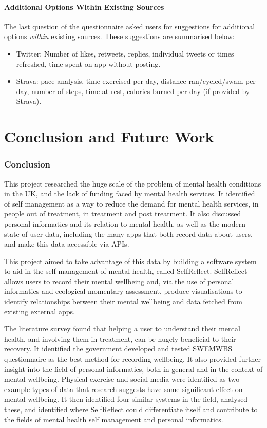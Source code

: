 \documentclass[11pt,openright,a4paper]{report}
\begin{document}
\subsubsection{Additional Options Within Existing Sources}
The last question of the questionnaire asked users for suggestions for additional options \emph{within} existing sources. These suggestions are summarised below:
\begin{itemize}
\item Twitter: Number of likes, retweets, replies, individual tweets or times refreshed, time spent on app without posting.
\item Strava: pace analysis, time exercised per day, distance ran/cycled/swam per day, number of steps, time at rest, calories burned per day (if provided by Strava).
\end{itemize}

\chapter{Conclusion and Future Work}
\subsection{Conclusion}
This project researched the huge scale of the problem of mental health conditions in the UK, and the lack of funding faced by mental health services. It identified of self management as a way to reduce the demand for mental health services, in people out of treatment, in treatment and post treatment. It also discussed personal informatics and its relation to mental health, as well as the modern state of user data, including the many apps that both record data about users, and make this data accessible via APIs.

This project aimed to take advantage of this data by building a software system to aid in the self management of mental health, called SelfReflect. SelfReflect allows users to record their mental wellbeing and, via the use of personal informatics and ecological momentary assessment, produce visualisations to identify relationships between their mental wellbeing and data fetched from existing external apps.

The literature survey found that helping a user to understand their mental health, and involving them in treatment, can be hugely beneficial to their recovery. It identified the government developed and tested SWEMWBS questionnaire as the best method for recording wellbeing. It also provided further insight into the field of personal informatics, both in general and in the context of mental wellbeing. Physical exercise and social media were identified as two example types of data that research suggests have some significant effect on mental wellbeing. It then identified four similar systems in the field, analysed these, and identified where SelfReflect could differentiate itself and contribute to the fields of mental health self management and personal informatics.
\end{document}
